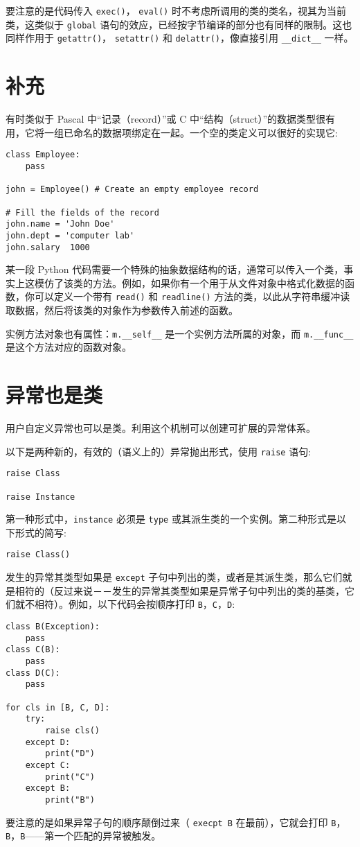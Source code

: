 要注意的是代码传入 \texttt{exec()}， \texttt{eval()} 时不考虑所调用的类的类名，视其为当前类，这类似于 \texttt{global} 语句的效应，已经按字节编译的部分也有同样的限制。这也同样作用于 \texttt{getattr()}， \texttt{setattr()} 和 \texttt{delattr()}，像直接引用 \verb|__dict__| 一样。
\section{补充}
有时类似于 Pascal 中“记录（record）”或 C 中“结构（struct）”的数据类型很有用，它将一组已命名的数据项绑定在一起。一个空的类定义可以很好的实现它:
\begin{lstlisting}
class Employee:
    pass

john = Employee() # Create an empty employee record

# Fill the fields of the record
john.name = 'John Doe'
john.dept = 'computer lab'
john.salary  1000
\end{lstlisting}
某一段 Python 代码需要一个特殊的抽象数据结构的话，通常可以传入一个类，事实上这模仿了该类的方法。例如，如果你有一个用于从文件对象中格式化数据的函数，你可以定义一个带有 \texttt{read()} 和 \texttt{readline()} 方法的类，以此从字符串缓冲读取数据，然后将该类的对象作为参数传入前述的函数。

实例方法对象也有属性：\verb|m.__self__| 是一个实例方法所属的对象，而 \verb|m.__func__| 是这个方法对应的函数对象。
\section{异常也是类}
用户自定义异常也可以是类。利用这个机制可以创建可扩展的异常体系。

以下是两种新的，有效的（语义上的）异常抛出形式，使用 \texttt{raise} 语句:
\begin{lstlisting}
raise Class

raise Instance
\end{lstlisting}
第一种形式中，\texttt{instance} 必须是 \texttt{type} 或其派生类的一个实例。第二种形式是以下形式的简写:
\begin{lstlisting}
raise Class()
\end{lstlisting}
发生的异常其类型如果是 \texttt{except} 子句中列出的类，或者是其派生类，那么它们就是相符的（反过来说－－发生的异常其类型如果是异常子句中列出的类的基类，它们就不相符）。例如，以下代码会按顺序打印 \verb|B|，\verb|C|，\verb|D|:
\begin{lstlisting}
class B(Exception):
    pass
class C(B):
    pass
class D(C):
    pass

for cls in [B, C, D]:
    try:
        raise cls()
    except D:
        print("D")
    except C:
        print("C")
    except B:
        print("B")
\end{lstlisting}
要注意的是如果异常子句的顺序颠倒过来（ \texttt{execpt B} 在最前），它就会打印 \verb|B|，\verb|B|，\verb|B|——第一个匹配的异常被触发。

